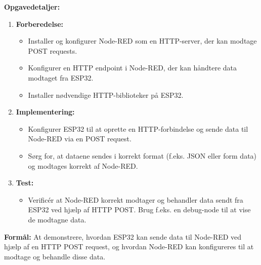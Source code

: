 \textbf{Opgavedetaljer:}
\begin{enumerate}
	\item \textbf{Forberedelse:}
	\begin{itemize}
		\item Installer og konfigurer Node-RED som en HTTP-server, der kan modtage POST requests.
		\item Konfigurer en HTTP endpoint i Node-RED, der kan håndtere data modtaget fra ESP32.
		\item Installer nødvendige HTTP-biblioteker på ESP32.
	\end{itemize}
	\item \textbf{Implementering:}
	\begin{itemize}
		\item Konfigurer ESP32 til at oprette en HTTP-forbindelse og sende data til Node-RED via en POST request.
		\item Sørg for, at dataene sendes i korrekt format (f.eks. JSON eller form data) og modtages korrekt af Node-RED.
	\end{itemize}
	\item \textbf{Test:}
	\begin{itemize}
		\item Verificér at Node-RED korrekt modtager og behandler data sendt fra ESP32 ved hjælp af HTTP POST. Brug f.eks. en debug-node til at vise de modtagne data.
	\end{itemize}
\end{enumerate}
\textbf{Formål:} At demonstrere, hvordan ESP32 kan sende data til Node-RED ved hjælp af en HTTP POST request, og hvordan Node-RED kan konfigureres til at modtage og behandle disse data.

